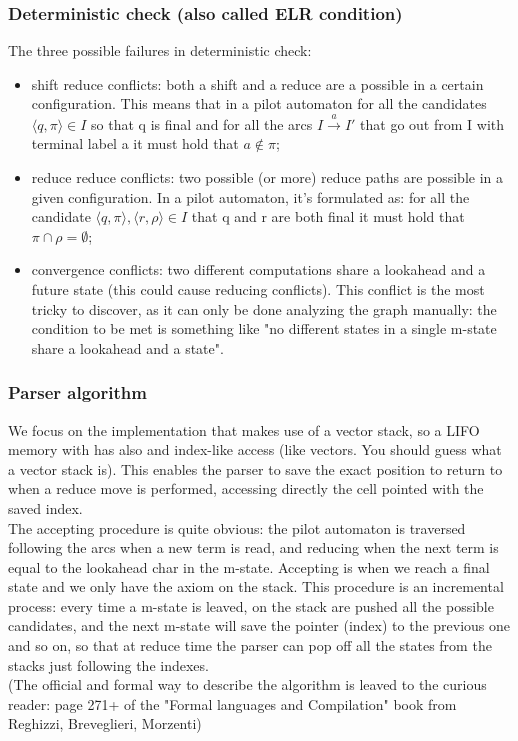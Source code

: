 \documentclass[10pt,a4paper]{article}
\begin{document}
				\subsubsection{Deterministic check (also called ELR condition)}	
					The three possible failures in deterministic check:
					\begin{itemize}
						\item shift reduce conflicts: both a shift and a reduce are a possible in a certain configuration. This means that in a pilot automaton for all the candidates $\langle q, \pi \rangle \in I$ so that q is final and for all the arcs $I \xrightarrow{a} I'$ that go out from I with terminal label a it must hold that $a \notin \pi$;
						\item reduce reduce conflicts: two possible (or more) reduce paths are possible in a given configuration. In a pilot automaton, it's formulated as: for all the candidate $\langle q, \pi \rangle, \langle r, \rho \rangle \in I$ that q and r are both final it must hold that $\pi \cap \rho = \emptyset$;
						\item convergence conflicts: two different computations share a lookahead and a future state (this could cause reducing conflicts). This conflict is the most tricky to discover, as it can only be done analyzing the graph manually: the condition to be met is something like "no different states in a single m-state share a lookahead and a state".
					\end{itemize}
					
				\subsubsection{Parser algorithm}
					We focus on the implementation that makes use of a vector stack, so a LIFO memory with has also and index-like access (like vectors. You should guess what a vector stack is). This enables the parser to save the exact position to return to when a reduce move is performed, accessing directly the cell pointed with the saved index.\\
					The accepting procedure is quite obvious: the pilot automaton is traversed following the arcs when a new term is read, and reducing when the next term is equal to the lookahead char in the m-state. Accepting is when we reach a final state and we only have the axiom on the stack. This procedure is an incremental process: every time a m-state is leaved, on the stack are pushed all the possible candidates, and the next m-state will save the pointer (index) to the previous one and so on, so that at reduce time the parser can pop off all the states from the stacks just following the indexes.\\
					(The official and formal way to describe the algorithm is leaved to the curious reader: page 271+ of the "Formal languages and Compilation" book from Reghizzi, Breveglieri, Morzenti)
				
\end{document}
